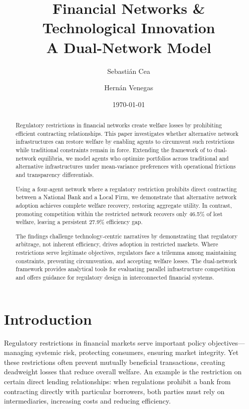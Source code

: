 \documentclass[12pt]{article}
\title{\textbf{Financial Networks \& Technological Innovation \\
A Dual-Network Model}}
\author{
    Sebastián Cea \and Hernán Venegas  
}
\date{\today}
\begin{document}
\maketitle

\begin{abstract}
\noindent Regulatory restrictions in financial networks create welfare losses by prohibiting efficient contracting relationships. This paper investigates whether alternative network infrastructures can restore welfare by enabling agents to circumvent such restrictions while traditional constraints remain in force. Extending the framework of \citet{jalan_incentive-aware_2024} to dual-network equilibria, we model agents who optimize portfolios across traditional and alternative infrastructures under mean-variance preferences with operational frictions and transparency differentials.

Using a four-agent network where a regulatory restriction prohibits direct contracting between a National Bank and a Local Firm, we demonstrate that alternative network adoption achieves complete welfare recovery, restoring aggregate utility. In contrast, promoting competition within the restricted network recovers only 46.5\% of lost welfare, leaving a persistent 27.9\% efficiency gap.


The findings challenge technology-centric narratives by demonstrating that regulatory arbitrage, not inherent efficiency, drives adoption in restricted markets. Where restrictions serve legitimate objectives, regulators face a trilemma among maintaining constraints, preventing circumvention, and accepting welfare losses. The dual-network framework provides analytical tools for evaluating parallel infrastructure competition and offers guidance for regulatory design in interconnected financial systems.


\end{abstract}


\section{Introduction}
\label{sec:introduction}

Regulatory restrictions in financial markets serve important policy objectives---managing systemic risk, protecting consumers, ensuring market integrity. Yet these restrictions often prevent mutually beneficial transactions, creating deadweight losses that reduce overall welfare. An example is the restriction on certain direct lending relationships: when regulations prohibit a bank from contracting directly with particular borrowers, both parties must rely on intermediaries, increasing costs and reducing efficiency.
\end{document}
